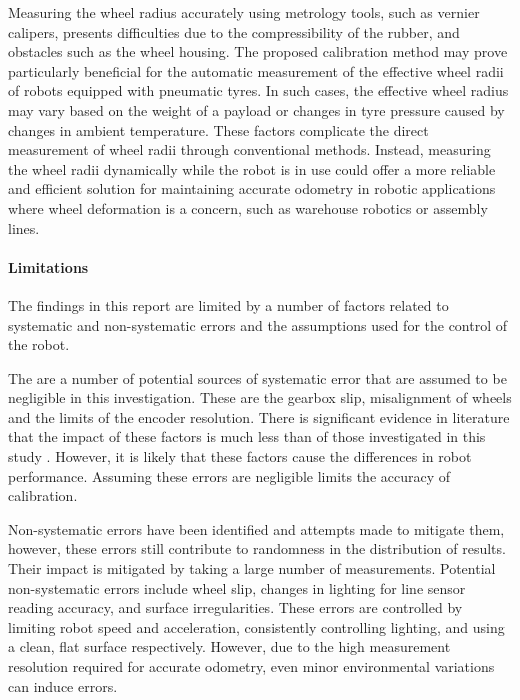 \documentclass[conference]{IEEEtran}
\begin{document}
Measuring the wheel radius accurately using metrology tools, such as vernier calipers, presents difficulties due to the compressibility of the rubber, and obstacles such as the wheel housing. 
The proposed calibration method may prove particularly beneficial for the automatic measurement of the effective wheel radii of robots equipped with pneumatic tyres.
In such cases, the effective wheel radius may vary based on the weight of a payload or changes in tyre pressure caused by changes in ambient temperature. 
These factors complicate the direct measurement of wheel radii through conventional methods.
Instead, measuring the wheel radii dynamically while the robot is in use could offer a more reliable and efficient solution for maintaining accurate odometry in robotic applications where wheel deformation is a concern, such as warehouse robotics or assembly lines.

\paragraph{Limitations}

The findings in this report are limited by a number of factors related to systematic and non-systematic errors and the assumptions used for the control of the robot. 

The are a number of potential sources of systematic error that are assumed to be negligible in this investigation.
These are the gearbox slip, misalignment of wheels and the limits of the encoder resolution. 
There is significant evidence in literature that the impact of these factors is much less than of those investigated in this study \cite{UMBmark}. 
However, it is likely that these factors cause the differences in robot performance.
Assuming these errors are negligible limits the accuracy of calibration. 

Non-systematic errors have been identified and attempts made to mitigate them, however, these errors still contribute to randomness in the distribution of results. 
Their impact is mitigated by taking a large number of measurements. 
Potential non-systematic errors include wheel slip, changes in lighting for line sensor reading accuracy, and surface irregularities. 
These errors are controlled by limiting robot speed and acceleration, consistently controlling lighting, and using a clean, flat surface respectively. 
However, due to the high measurement resolution required for accurate odometry, even minor environmental variations can induce errors.
\end{document}
